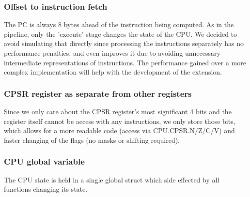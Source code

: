 \documentclass[11pt]{article}
\begin{document}
        \subsubsection*{Offset to instruction fetch}
           The PC is always 8 bytes ahead of the instruction being computed. As in the pipeline, only the 'execute' stage changes the state of the CPU. We decided to avoid simulating that directly since processing the instructions separately has no performance penalties, and even improves it due to avoiding unnecessary intermediate representations of instructions. The performance gained over a more complex implementation will help with the development of the extension.
        \subsubsection*{CPSR register as separate from other registers}
            Since we only care about the CPSR register's most significant 4 bits and the register itself cannot be access with any instructions, we only store those bits, which allows for a more readable code (access via CPU.CPSR.N/Z/C/V) and faster changing of the flags (no masks or shifting required).
        \subsubsection*{CPU global variable}
            The CPU state is held in a single global struct which side effected by all functions changing its state.
\end{document}
